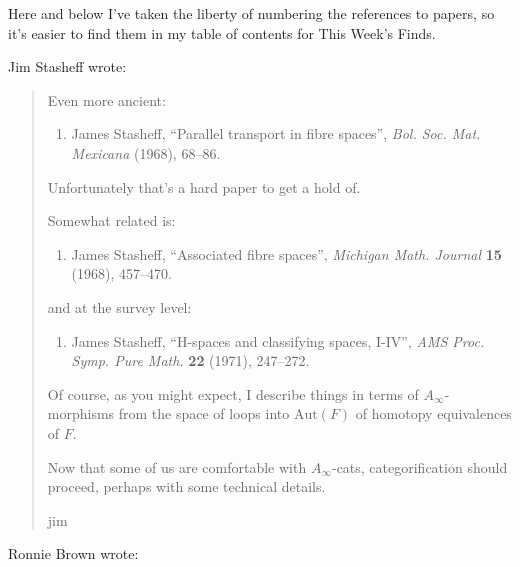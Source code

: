 \documentclass{article}
\def\tightlist{}
\begin{document}
Here and below I've taken the liberty of numbering the references to
papers, so it's easier to find them in my table of contents for This
Week's Finds.

Jim Stasheff wrote:

\begin{quote}
Even more ancient:

\begin{enumerate}
\def\labelenumi{\arabic{enumi})}
\setcounter{enumi}{16}
\tightlist
\item
  James Stasheff, ``Parallel transport in fibre spaces'', \emph{Bol.
  Soc. Mat. Mexicana} (1968), 68--86.
\end{enumerate}

Unfortunately that's a hard paper to get a hold of.

Somewhat related is:

\begin{enumerate}
\def\labelenumi{\arabic{enumi})}
\setcounter{enumi}{17}
\tightlist
\item
  James Stasheff, ``Associated fibre spaces'', \emph{Michigan Math.
  Journal} \textbf{15} (1968), 457--470.
\end{enumerate}

and at the survey level:

\begin{enumerate}
\def\labelenumi{\arabic{enumi})}
\setcounter{enumi}{18}
\tightlist
\item
  James Stasheff, ``H-spaces and classifying spaces, I-IV'', \emph{AMS
  Proc. Symp. Pure Math.} \textbf{22} (1971), 247--272.
\end{enumerate}

Of course, as you might expect, I describe things in terms of
\(A_\infty\)-morphisms from the space of loops into \(\mathrm{Aut}(F)\)
of homotopy equivalences of \(F\).

Now that some of us are comfortable with \(A_\infty\)-cats,
categorification should proceed, perhaps with some technical details.

jim
\end{quote}

Ronnie Brown wrote:
\end{document}
